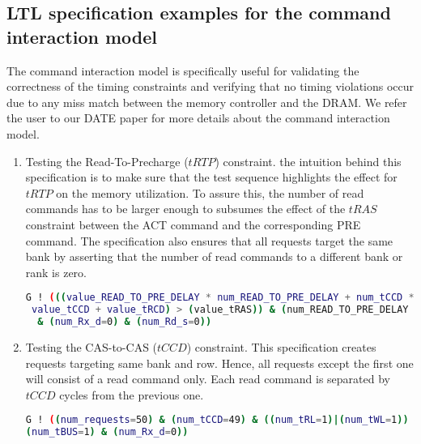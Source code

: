 \subsection{LTL specification examples for the command interaction model} 

The command interaction model is specifically useful for validating the correctness of the timing constraints and verifying that no timing violations occur due to any miss match between the memory controller and the DRAM. 
We refer the user to our DATE paper for more details about the command interaction model.

\begin{enumerate}[leftmargin=*]
\item Testing the Read-To-Precharge ($tRTP$) constraint. 
the intuition behind this specification is to make sure that the test sequence highlights the effect for $tRTP$ on the memory utilization. 
To assure this, the number of read commands has to be larger enough to subsumes the effect of the $tRAS$ constraint between the ACT command and the corresponding PRE command. 
The specification also ensures that all requests target the same bank by asserting that the number of read commands to a different bank or rank is zero. 
\begin{lstlisting}[language=bash]
G ! (((value_READ_TO_PRE_DELAY * num_READ_TO_PRE_DELAY + num_tCCD *
 value_tCCD + value_tRCD) > (value_tRAS)) & (num_READ_TO_PRE_DELAY > 0)
  & (num_Rx_d=0) & (num_Rd_s=0))
\end{lstlisting} 

\item Testing the CAS-to-CAS ($tCCD$) constraint. 
This specification creates requests targeting same bank and row. Hence, all requests except the first one will consist of a read command only. 
Each read command is separated by $tCCD$ cycles from the previous one. 


\begin{lstlisting}[language=bash]
G ! ((num_requests=50) & (num_tCCD=49) & ((num_tRL=1)|(num_tWL=1)) &
(num_tBUS=1) & (num_Rx_d=0))
\end{lstlisting} 
\end{enumerate} 
